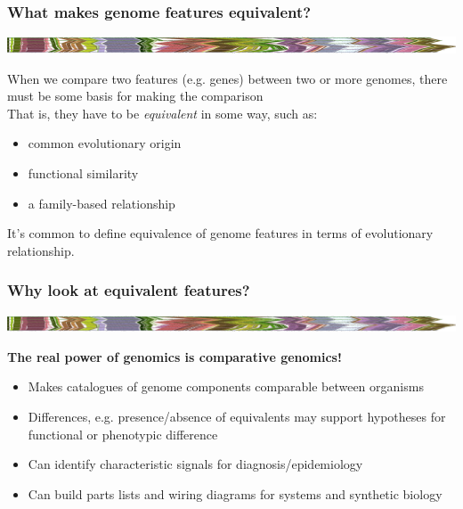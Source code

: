 
\begin{frame}
  \frametitle{What makes genome features equivalent?}
  \begin{center}
    \includegraphics[width=1\textwidth]{images/collinear_zeae}  
  \end{center}
  When we compare two features (e.g. genes) between two or more genomes, there must be some basis for making the comparison \\
  That is, they have to be \textit{equivalent} in some way, such as:
  \begin{itemize}
    \item common evolutionary origin
    \item functional similarity
    \item a family-based relationship
  \end{itemize}
  It's common to define equivalence of genome features in terms of evolutionary relationship.
\end{frame}

\begin{frame}
  \frametitle{Why look at equivalent features?}
  \begin{center}
    \includegraphics[width=1\textwidth]{images/collinear_zeae}  
  \end{center}
  \textbf{The real power of genomics is comparative genomics!}
  \begin{itemize}
    \item Makes catalogues of genome components comparable between organisms
    \item Differences, e.g. presence/absence of equivalents may support hypotheses for functional or phenotypic difference
    \item Can identify characteristic signals for diagnosis/epidemiology
    \item Can build parts lists and wiring diagrams for systems and synthetic biology
  \end{itemize}
\end{frame}
